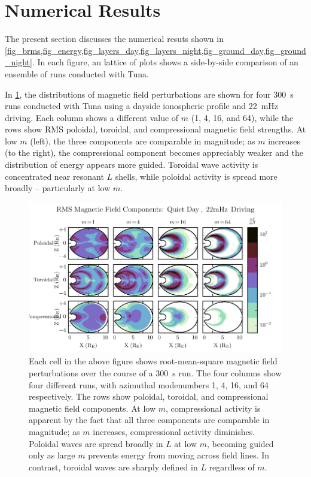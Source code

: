 \documentclass[draft,linenumbers]{agujournal}
\begin{document}

\section{Numerical Results}

The present section discusses the numerical resuts shown in \cref{fig_brms,fig_energy,fig_layers_day,fig_layers_night,fig_ground_day,fig_ground_night}. In each figure, an lattice of plots shows a side-by-side comparison of an ensemble of runs conducted with Tuna.

In \cref{fig_brms}, the distributions of magnetic field perturbations are shown for four \SI{300}{\second} runs conducted with Tuna using a dayside ionospheric profile and \SI{22}{\mHz} driving. Each column shows a different value of $m$ (1, 4, 16, and 64), while the rows show RMS poloidal, toroidal, and compressional magnetic field strengths. At low $m$ (left), the three components are comparable in magnitude; as $m$ increases (to the right), the compressional component becomes appreciably weaker and the distribution of energy appears more guided. Toroidal wave activity is concentrated near resonant $L$ shells, while poloidal activity is spread more broadly -- particularly at low $m$.

\begin{figure}
    \begin{center}
    \includegraphics[width=\textwidth]{figures/fig_brms.pdf}
    \caption{
        Each cell in the above figure shows root-mean-square magnetic field perturbations over the course of a \SI{300}{\s} run. The four columns show four different runs, with azimuthal modenumbers 1, 4, 16, and 64 respectively. The rows show poloidal, toroidal, and compressional magnetic field components. At low $m$, compressional activity is apparent by the fact that all three components are comparable in magnitude; as $m$ increases, compressional activity diminishes. Poloidal waves are spread broadly in $L$ at low $m$, becoming guided only as large $m$ prevents energy from moving across field lines. In contrast, toroidal waves are sharply defined in $L$ regardless of $m$.
    }
    \label{fig_brms}
    \end{center}
\end{figure}
\end{document}
